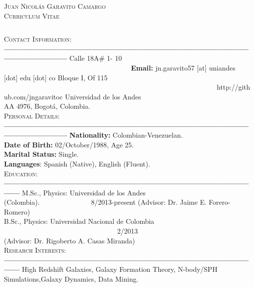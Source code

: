 \documentclass[letterpaper]{article}
\begin{document}
\begin{center}
\textsc{\LARGE Juan Nicol\'as Garavito Camargo}\\
\textsc{\large Curriculum Vitae}\\
\end{center}

$    $


\textsc{\Large Contact Information:}\\
{\bf---------------------------------------------------------------------------------------------------------------------}
Calle 18A\# 1- 10 \indent \ \ \ \ \ \ \ \ \ \ \ \ \ \ \ \ \ \ \ \ \ \ \ \ \ \ \ \ \ \ \ \ \ \  \ \  \ {\bf Email:} jn.garavito57 [at] uniandes [dot] edu [dot] co       
Bloque I, Of 115 \indent \ \ \ \ \ \ \ \ \ \ \ \ \ \ \ \ \ \ \ \ \ \ \ \ \ \ \ \ \ \ \ \ \ \ \ \ \ \ \ \ \ \ \ \ \ \ \ \ \ \ \ \ \ \ \ \ \ \ \ \ \ \    http://github.com/jngaravitoc            
Universidad de los Andes\\
AA 4976, Bogot\'a, Colombia.\\
	
\indent \textsc{\Large Personal Details:}\\
{\bf---------------------------------------------------------------------------------------------------------------------}
{\bf \large Nationality:} \large Colombian-Venezuelan.\\
{\bf Date of Birth:} 02/October/1988, Age 25.\\
{\bf Marital Status:} Single.\\
{\bf Languages}: Spanish (Native), English (Fluent).\\


\textsc{\Large Education:}\\
{\bf---------------------------------------------------------------------------------------------------}
M.Sc., Physics: Universidad de los Andes (Colombia).\indent \ \ \ \ \ \ \ \ \ \ \ \ \ \ \  8/2013-present
(Advisor: Dr. Jaime E. Forero-Romero)\\
B.Sc., Physics: Universidad Nacional de Colombia \indent \ \ \ \ \ \ \ \ \ \ \ \ \ \ \ \ \ \ \ \ \ \ \ \ \ \ \ \ \ \ \ \ \ 2/2013\\
(Advisor: Dr. Rigoberto A. Casas Miranda)\\

\textsc{\Large Research Interests:}\\
{\bf---------------------------------------------------------------------------------------------------}
High Redshift Galaxies, Galaxy Formation Theory, N-body/SPH Simulations,Galaxy Dynamics, Data Mining.\\
\end{document}
